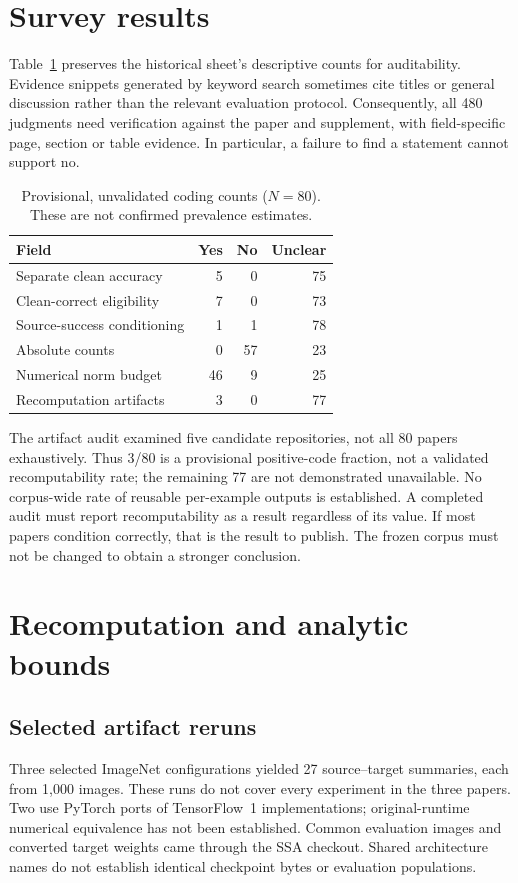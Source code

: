 \documentclass[10pt,twocolumn]{article}
\begin{document}
\section{Survey results}
Table~\ref{tab:survey} preserves the historical sheet's descriptive counts for auditability. Evidence snippets generated by keyword search sometimes cite titles or general discussion rather than the relevant evaluation protocol. Consequently, all 480 judgments need verification against the paper and supplement, with field-specific page, section or table evidence. In particular, a failure to find a statement cannot support no.

\begin{table}[t]
\centering
\caption{Provisional, unvalidated coding counts ($N=80$). These are not confirmed prevalence estimates.}
\label{tab:survey}
\begin{tabular}{lrrr}
\toprule
Field & Yes & No & Unclear\\
\midrule
Separate clean accuracy & 5 & 0 & 75\\
Clean-correct eligibility & 7 & 0 & 73\\
Source-success conditioning & 1 & 1 & 78\\
Absolute counts & 0 & 57 & 23\\
Numerical norm budget & 46 & 9 & 25\\
Recomputation artifacts & 3 & 0 & 77\\
\bottomrule
\end{tabular}
\end{table}

The artifact audit examined five candidate repositories, not all 80 papers exhaustively. Thus 3/80 is a provisional positive-code fraction, not a validated recomputability rate; the remaining 77 are not demonstrated unavailable. No corpus-wide rate of reusable per-example outputs is established. A completed audit must report recomputability as a result regardless of its value. If most papers condition correctly, that is the result to publish. The frozen corpus must not be changed to obtain a stronger conclusion.

\section{Recomputation and analytic bounds}
\subsection{Selected artifact reruns}
Three selected ImageNet configurations yielded 27 source--target summaries, each from 1,000 images. These runs do not cover every experiment in the three papers. Two use PyTorch ports of TensorFlow~1 implementations; original-runtime numerical equivalence has not been established. Common evaluation images and converted target weights came through the SSA checkout. Shared architecture names do not establish identical checkpoint bytes or evaluation populations.
\end{document}
